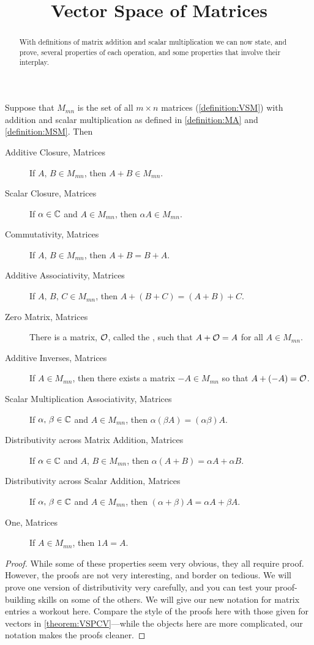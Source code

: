 \documentclass{ximera}
\title{Vector Space of Matrices}
\begin{document}
\begin{abstract}
  With definitions of matrix addition and scalar multiplication we can
  now state, and prove, several properties of each operation, and some
  properties that involve their interplay.
\end{abstract}
\maketitle

\begin{theorem}
\label{theorem:VSPM}

Suppose that $M_{mn}$ is the set of all $m\times n$ matrices
(\ref{definition:VSM}) with addition and scalar multiplication as
defined in \ref{definition:MA} and \ref{definition:MSM}.  Then

\begin{description}
\item[Additive Closure, Matrices]
If $A,\,B\in M_{mn}$, then $A+B\in M_{mn}$.
\item[Scalar Closure, Matrices]
If $\alpha\in\mathbb{C}$ and $A\in M_{mn}$, then $\alpha A\in M_{mn}$.
\item[Commutativity, Matrices]
If $A,\,B\in M_{mn}$, then $A+B=B+A$.
\item[Additive Associativity, Matrices]
If $A,\,B,\,C\in M_{mn}$, then $A+\left(B+C\right)=\left(A+B\right)+C$.
\item[Zero Matrix, Matrices]
There is a matrix, $\mathcal{O}$, called the , such that  $A+\mathcal{O}=A$  for all $A\in M_{mn}$.
\item[Additive Inverses, Matrices]
If $A\in M_{mn}$, then there exists a matrix $-A\in M_{mn}$ so that $A+(-A)=\mathcal{O}$.
\item[Scalar Multiplication Associativity, Matrices]
If $\alpha,\,\beta\in\mathbb{C}$ and $A\in M_{mn}$, then $\alpha(\beta A)=(\alpha\beta)A$.
\item[Distributivity across Matrix Addition, Matrices]
If $\alpha\in\mathbb{C}$ and $A,\,B\in M_{mn}$, then $\alpha(A+B)=\alpha A+\alpha B$.
\item[Distributivity across Scalar Addition, Matrices]
If $\alpha,\,\beta\in\mathbb{C}$ and $A\in M_{mn}$, then
$(\alpha+\beta)A=\alpha A+\beta A$.
\item[One, Matrices]
If $A\in M_{mn}$, then $1A=A$.
\end{description}

\begin{proof}
  While some of these properties seem very obvious, they all require
  proof.  However, the proofs are not very interesting, and border on
  tedious. We will prove one version of distributivity very carefully,
  and you can test your proof-building skills on some of the others.
  We will give our new notation for matrix entries a workout here.
  Compare the style of the proofs here with those given for vectors in
  \ref{theorem:VSPCV}---while the objects here are more complicated,
  our notation makes the proofs cleaner.


\end{proof}
\end{theorem}
\end{document}
